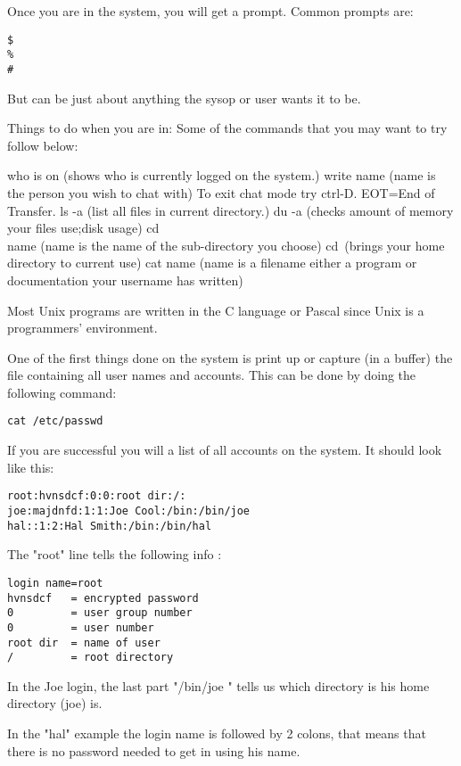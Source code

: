 \documentclass[a1paper]{article}
\begin{document}
\begin{multicols}{7}
{  Once you are in the system, you will get a prompt.  Common prompts are:

\begin{verbatim}
$
%
#
\end{verbatim}


  But can be just about anything the sysop or user wants it to be.

  Things to do when you are in:  Some of the commands that you may want to try
follow below:

  who is on (shows who is currently logged on the system.)
  write name (name is the person you wish to chat with)
  To exit chat mode try ctrl-D.
  EOT=End of Transfer.
  ls -a (list all files in current directory.)
  du -a (checks amount of memory your files use;disk usage)
  cd\\name (name is the name of the sub-directory you choose)
  cd\ (brings your home directory to current use)
  cat name (name is a filename either a program or documentation your username
has written)

  Most Unix programs are written in the C language or Pascal since Unix is a
programmers' environment.

  One of the first things done on the system is print up or capture (in a
buffer) the file containing all user names and accounts.  This can be done by
doing the following command:


\begin{verbatim}
cat /etc/passwd
\end{verbatim}



  If you are successful you will a list of all accounts on the system.  It
should look like this:

\begin{verbatim}
root:hvnsdcf:0:0:root dir:/:
joe:majdnfd:1:1:Joe Cool:/bin:/bin/joe
hal::1:2:Hal Smith:/bin:/bin/hal
\end{verbatim}


  The "root" line tells the following info :

\begin{verbatim}
login name=root
hvnsdcf   = encrypted password
0         = user group number
0         = user number
root dir  = name of user
/         = root directory
\end{verbatim}

  In the Joe login, the last part "/bin/joe " tells us which directory is his
home directory (joe) is.

  In the "hal" example the login name is followed by 2 colons, that means that
there is no password needed to get in using his name.

}
\end{multicols}
\end{document}
